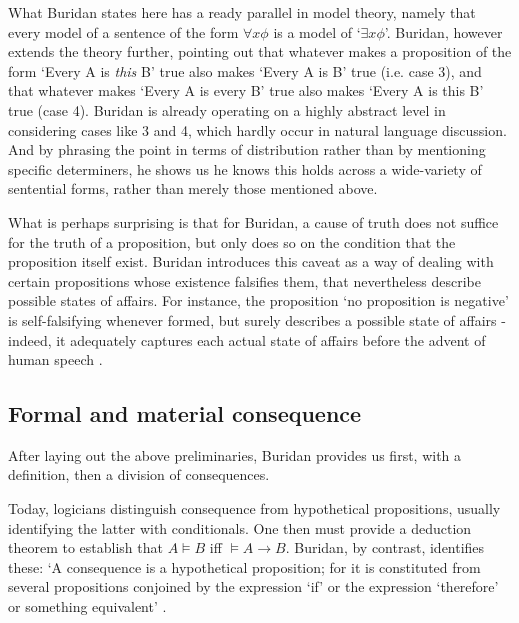 \documentclass[]{article}
\begin{document}
What Buridan states here has a ready parallel in model theory, namely that every model of a sentence of the form $\forall x \phi$ is a model of `$\exists x \phi$'. Buridan, however extends the theory further, pointing out that whatever makes a proposition of the form `Every A is \textit{this} B' true also makes `Every A is B' true (i.e. case 3), and that whatever makes `Every A is every B' true also makes `Every A is this B' true (case 4). Buridan is already operating on a highly abstract level in considering cases like 3 and 4, which hardly occur in natural language discussion. And by phrasing the point in terms of distribution rather than by mentioning specific determiners, he shows us he knows this holds across a wide-variety of sentential forms, rather than merely those mentioned above.

What is perhaps surprising is that for Buridan, a cause of truth does not suffice for the truth of a proposition, but only does so on the condition that the proposition itself exist. Buridan introduces this caveat as a way of dealing with certain propositions whose existence falsifies them, that nevertheless describe possible states of affairs. For instance, the proposition `no proposition is negative' is self-falsifying whenever formed, but surely describes a possible state of affairs - indeed, it adequately captures each actual state of affairs before the advent of human speech \autocite[I. 3]{Buridan2015}.
\subsection{Formal and material consequence}
After laying out the above preliminaries, Buridan provides us first, with a definition, then a division of consequences.

Today, logicians distinguish consequence from hypothetical propositions, usually identifying the latter with conditionals. One then must provide a deduction theorem to establish that $A \models B$ iff $\models A \rightarrow B$. Buridan, by contrast, identifies these: `A consequence is a hypothetical proposition; for it is constituted from several propositions conjoined by the expression `if' or the expression `therefore' or something equivalent' \autocite[I. 3, 66, alt.]{Buridan2015}. 
\end{document}
